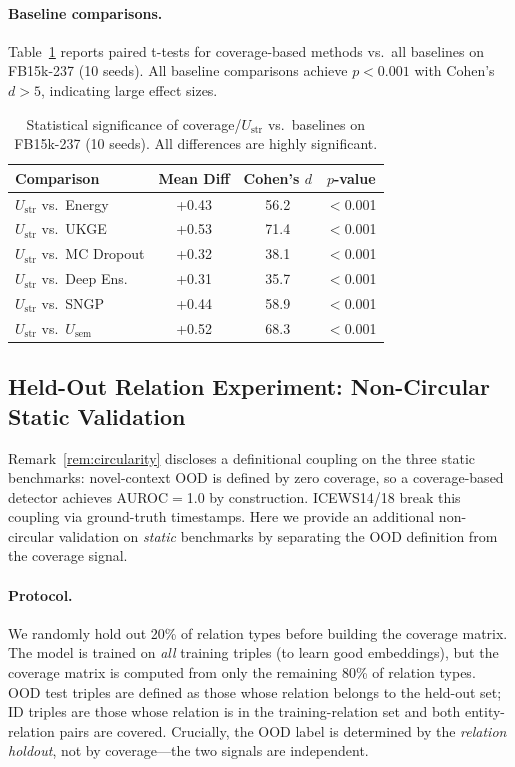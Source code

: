 \documentclass{article}
\begin{document}
\paragraph{Baseline comparisons.}
Table~\ref{tab:baseline_significance} reports paired t-tests for coverage-based methods vs.\ all baselines on FB15k-237 (10 seeds). All baseline comparisons achieve $p < 0.001$ with Cohen's $d > 5$, indicating large effect sizes.

\begin{table}[ht]
\centering
\caption{Statistical significance of coverage/$U_{\text{str}}$ vs.\ baselines on FB15k-237 (10 seeds). All differences are highly significant.}
\label{tab:baseline_significance}
\small
\begin{tabular}{lccc}
\toprule
Comparison & Mean Diff & Cohen's $d$ & $p$-value \\
\midrule
$U_{\text{str}}$ vs.\ Energy & +0.43 & 56.2 & $<$0.001 \\
$U_{\text{str}}$ vs.\ UKGE & +0.53 & 71.4 & $<$0.001 \\
$U_{\text{str}}$ vs.\ MC Dropout & +0.32 & 38.1 & $<$0.001 \\
$U_{\text{str}}$ vs.\ Deep Ens. & +0.31 & 35.7 & $<$0.001 \\
$U_{\text{str}}$ vs.\ SNGP & +0.44 & 58.9 & $<$0.001 \\
$U_{\text{str}}$ vs.\ $U_{\text{sem}}$ & +0.52 & 68.3 & $<$0.001 \\
\bottomrule
\end{tabular}
\end{table}

\subsection{Held-Out Relation Experiment: Non-Circular Static Validation}
\label{app:held_out}

Remark~\ref{rem:circularity} discloses a definitional coupling on the three static benchmarks: novel-context OOD is defined by zero coverage, so a coverage-based detector achieves AUROC$=$1.0 by construction.
ICEWS14/18 break this coupling via ground-truth timestamps.
Here we provide an additional non-circular validation on \emph{static} benchmarks by separating the OOD definition from the coverage signal.

\paragraph{Protocol.}
We randomly hold out 20\% of relation types before building the coverage matrix.
The model is trained on \emph{all} training triples (to learn good embeddings), but the coverage matrix is computed from only the remaining 80\% of relation types.
OOD test triples are defined as those whose relation belongs to the held-out set; ID triples are those whose relation is in the training-relation set and both entity-relation pairs are covered.
Crucially, the OOD label is determined by the \emph{relation holdout}, not by coverage---the two signals are independent.
\end{document}
